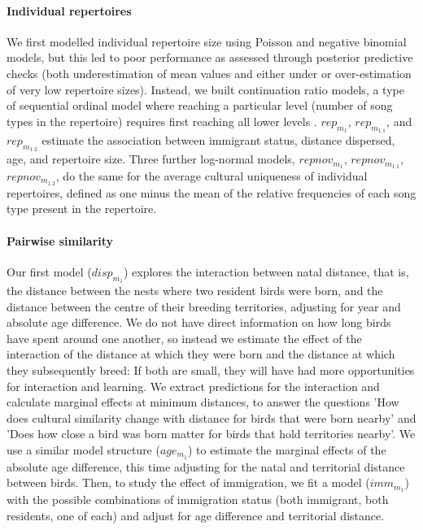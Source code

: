 \documentclass[9pt, onecolumn, twoside, lineno]{gsajnl}
\begin{document}
\paragraph{Individual repertoires}
We first modelled individual repertoire size using Poisson and negative binomial models, but this led to poor performance as assessed through posterior predictive checks (both underestimation of mean values and either under or over-estimation of very low repertoire sizes). Instead, we built continuation ratio models, a type of sequential ordinal model where reaching a particular level (number of song types in the repertoire) requires first reaching all lower levels \autocite{chambers2023, warti2020}. $rep_{m_1}$, $rep_{m_{1.1}}$, and $rep_{m_{1.2}}$ estimate the association between immigrant status, distance dispersed, age, and repertoire size. Three further log-normal models, $repnov_{m_1}$, $repnov_{m_{1.1}}$, $repnov_{m_{1.2}}$, do the same for the average cultural uniqueness of individual repertoires, defined as one minus the mean of the relative frequencies of each song type present in the repertoire.

\paragraph{Pairwise similarity}
Our first model ($disp_{m_1}$) explores the interaction between natal distance, that is, the distance between the nests where two resident birds were born, and the distance between the centre of their breeding territories, adjusting for year and absolute age difference. We do not have direct information on how long birds have spent around one another, so instead we estimate the effect of the interaction of the distance at which they were born and the distance at which they subsequently breed: If both are small, they will have had more opportunities for interaction and learning. We extract predictions for the interaction and calculate marginal effects at minimum distances, to answer the questions 'How does cultural similarity change with distance for birds that were born nearby' and 'Does how close a bird was born matter for birds that hold territories nearby'. We use a similar model structure ($age_{m_1}$) to estimate the marginal effects of the absolute age difference, this time adjusting for the natal and territorial distance between birds. Then, to study the effect of immigration, we fit a model ($imm_{m_1}$) with the possible combinations of immigration status (both immigrant, both residents, one of each) and adjust for age difference and territorial distance. 
\end{document}

